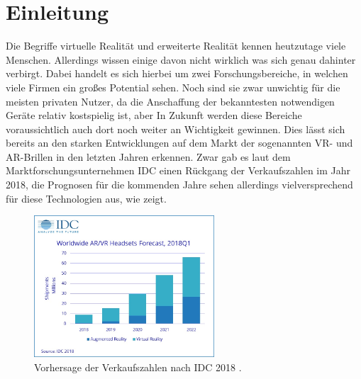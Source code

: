 
\chapter{Einleitung}\label{chapter:introduction}

	
	
	Die Begriffe virtuelle Realität und erweiterte Realität kennen heutzutage viele Menschen. Allerdings wissen einige davon nicht wirklich was sich genau dahinter verbirgt. Dabei handelt es sich hierbei um zwei Forschungsbereiche, in welchen viele Firmen ein großes Potential sehen. Noch sind sie zwar unwichtig für die meisten privaten Nutzer, da die Anschaffung der bekanntesten notwendigen Geräte relativ kostspielig ist, aber In Zukunft werden diese Bereiche voraussichtlich auch dort noch weiter an Wichtigkeit gewinnen.
	Dies lässt sich bereits an den starken Entwicklungen auf dem Markt der sogenannten VR- und AR-Brillen in den letzten Jahren erkennen.
	Zwar gab es laut dem Marktforschungsunternehmen IDC einen Rückgang der Verkaufszahlen im Jahr 2018, die Prognosen für die kommenden Jahre sehen allerdings vielversprechend für diese Technologien aus, wie  zeigt.
	
	\begin{figure}[htbp]
		\centering
		\includegraphics[width=0.6\textwidth]{figures/IDC-2018.jpg}
		\caption{Vorhersage der Verkaufszahlen nach IDC 2018 .}
		\label{fig:forecast_diagram}
	\end{figure}
	
